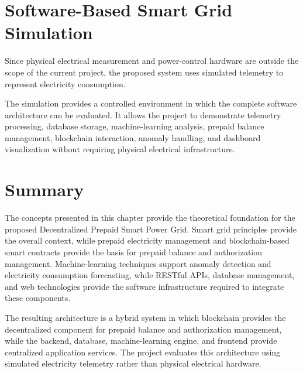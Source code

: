 \section{Software-Based Smart Grid Simulation}

Since physical electrical measurement and power-control hardware are outside the scope of the current project, the proposed system uses simulated telemetry to represent electricity consumption.

The simulation provides a controlled environment in which the complete software architecture can be evaluated. It allows the project to demonstrate telemetry processing, database storage, machine-learning analysis, prepaid balance management, blockchain interaction, anomaly handling, and dashboard visualization without requiring physical electrical infrastructure.


\section{Summary}

The concepts presented in this chapter provide the theoretical foundation for the proposed Decentralized Prepaid Smart Power Grid. Smart grid principles provide the overall context, while prepaid electricity management and blockchain-based smart contracts provide the basis for prepaid balance and authorization management. Machine-learning techniques support anomaly detection and electricity consumption forecasting, while RESTful APIs, database management, and web technologies provide the software infrastructure required to integrate these components.

The resulting architecture is a hybrid system in which blockchain provides the decentralized component for prepaid balance and authorization management, while the backend, database, machine-learning engine, and frontend provide centralized application services. The project evaluates this architecture using simulated electricity telemetry rather than physical electrical hardware.